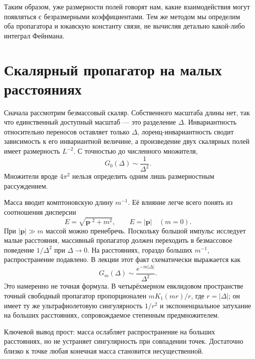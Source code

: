 Таким образом, уже размерности полей говорят нам, какие взаимодействия могут появляться с безразмерными коэффициентами. Тем же методом мы определим оба пропагатора и юкавскую константу связи, не вычисляя детально какой-либо интеграл Фейнмана.

\section{Скалярный пропагатор на малых расстояниях}

Сначала рассмотрим безмассовый скаляр. Собственного масштаба длины нет, так что единственный доступный масштаб — это разделение \(\Delta\). Инвариантность относительно переносов оставляет только \(\Delta\), лоренц-инвариантность сводит зависимость к его инвариантной величине, а произведение двух скалярных полей имеет размерность \(L^{-2}\). С точностью до численного множителя,
\begin{equation}
G_0(\Delta)\sim\frac{1}{\Delta^2}.
\end{equation}
Множители вроде \(4\pi^2\) нельзя определить одним лишь размерностным рассуждением.

Масса вводит комптоновскую длину \(m^{-1}\). Её влияние легче всего понять из соотношения дисперсии
\begin{equation}
E=\sqrt{\bm p^{,2}+m^2},
\qquad
E=|\bm p|\quad(m=0).
\end{equation}
При \(|\bm p|\gg m\) массой можно пренебречь. Поскольку большой импульс исследует малые расстояния, массивный пропагатор должен переходить в безмассовое поведение \(1/\Delta^2\) при \(\Delta\to0\). На расстояниях, гораздо больших \(m^{-1}\), распространение подавлено. В лекции этот факт схематически выражается как
\begin{equation}
G_m(\Delta)\sim \frac{e^{-m|\Delta|}}{\Delta^2}.
\end{equation}
Это намеренно не точная формула. В четырёхмерном евклидовом пространстве точный свободный пропагатор пропорционален \(mK_1(mr)/r\), где \(r=|\Delta|\); он имеет ту же ультрафиолетовую сингулярность \(1/r^2\) и экспоненциальное затухание на больших расстояниях, сопровождаемое степенным предмножителем.

Ключевой вывод прост: масса ослабляет распространение на больших расстояниях, но не устраняет сингулярность при совпадении точек. Достаточно близко к точке любая конечная масса становится несущественной.

